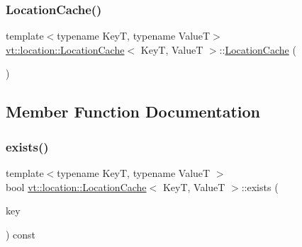 \mbox{\label{structvt_1_1location_1_1_location_cache_ab6e98f027816ca0bc92d442b63160900}} 
\subsubsection{\texorpdfstring{Location\+Cache()}{LocationCache()}\hspace{0.1cm}{\footnotesize\ttfamily [3/3]}}
{\footnotesize\ttfamily template$<$typename KeyT, typename ValueT$>$ \\
\hyperlink{structvt_1_1location_1_1_location_cache}{vt\+::location\+::\+Location\+Cache}$<$ KeyT, ValueT $>$\+::\hyperlink{structvt_1_1location_1_1_location_cache}{Location\+Cache} (\begin{DoxyParamCaption}\item[{\hyperlink{structvt_1_1location_1_1_location_cache}{Location\+Cache}$<$ KeyT, ValueT $>$ \&\&}]{ }\end{DoxyParamCaption})\hspace{0.3cm}{\ttfamily [default]}}



\subsection{Member Function Documentation}
\mbox{\label{structvt_1_1location_1_1_location_cache_a2e2f1c3ef1611782da77635c4181eae4}} 
\subsubsection{\texorpdfstring{exists()}{exists()}}
{\footnotesize\ttfamily template$<$typename KeyT, typename ValueT $>$ \\
bool \hyperlink{structvt_1_1location_1_1_location_cache}{vt\+::location\+::\+Location\+Cache}$<$ KeyT, ValueT $>$\+::exists (\begin{DoxyParamCaption}\item[{KeyT const \&}]{key }\end{DoxyParamCaption}) const}

